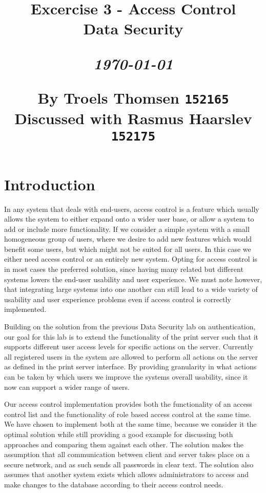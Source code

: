\documentclass[12pt]{article}
\title{
  \vspace{4cm}
  \begin{flushleft}
  \Large{\textbf{Excercise 3 - Access Control}} \\
  \large{Data Security} \\
  \end{flushleft}
  \vspace{0cm}
  \begin{flushleft}
  \small
  \textit{\today}
  \end{flushleft}
  \vspace{12cm}
  \begin{flushleft}
  \small
  By Troels Thomsen \texttt{152165}\\
  Discussed with Rasmus Haarslev \texttt{152175}
  \end{flushleft}
}
\date{
}
\begin{document}
\clearpage
{}
\thispagestyle{empty}
\maketitle

\newpage

\tableofcontents

\newpage


\section{Introduction}
\label{sec:Introduction}

In any system that deals with end-users, access control is a feature which usually allows the system to either expand onto a wider user base, or allow a system to add or include more functionality. If we consider a  simple system with a small homogeneous group of users, where we desire to add new features which would benefit some users, but which might not be suited for all users. In this case we either need access control or an entirely new system. Opting for access control is in most cases the preferred solution, since having many related but different systems lowers the end-user usability and user experience. We must note however, that integrating large systems into one another can still lead to a wide variety of usability and user experience problems even if access control is correctly implemented.

Building on the solution from the previous Data Security lab on authentication, our goal for this lab is to extend the functionality of the print server such that it supports different user access levels for specific actions on the server. Currently all registered users in the system are allowed to perform all actions on the server as defined in the print server interface. By providing granularity in what actions can be taken by which users we improve the systems overall usability, since it now can support a wider range of users.

Our access control implementation provides both the functionality of an access control list and the functionality of role based access control at the same time. We have chosen to implement both at the same time, because we consider it the optimal solution while still providing a good example for discussing both approaches and comparing them against each other. The solution makes the assumption that all communication between client and server takes place on a secure network, and as such sends all passwords in clear text. The solution also assumes that another system exists which allows administrators to access and make changes to the database according to their access control needs.
\end{document}
